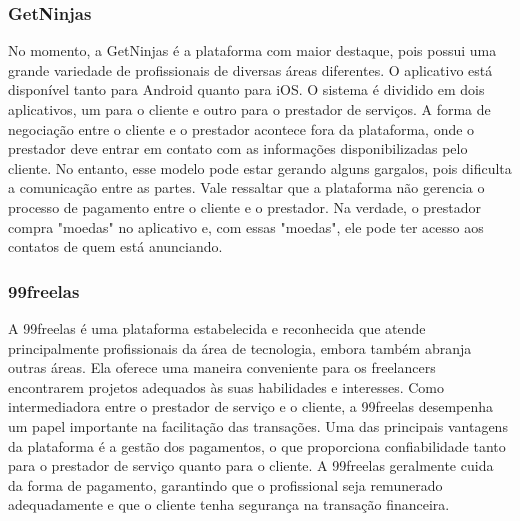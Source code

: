 \subsubsection{GetNinjas}
No momento, a GetNinjas é a plataforma com maior destaque, pois possui uma grande variedade de profissionais de diversas áreas diferentes.
O aplicativo está disponível tanto para Android quanto para iOS. O sistema é dividido em dois aplicativos, um para o cliente e outro para o
prestador de serviços. A forma de negociação entre o cliente e o prestador acontece fora da plataforma, onde o prestador deve entrar em contato com as informações disponibilizadas pelo cliente. No entanto, esse modelo pode estar gerando alguns gargalos, pois dificulta a comunicação entre as partes. Vale ressaltar que a plataforma não gerencia o processo de pagamento entre o cliente e o prestador. Na verdade, o prestador compra "moedas" no aplicativo e, com essas "moedas", ele pode ter acesso aos contatos de quem está anunciando.
\subsubsection{99freelas}
A 99freelas é uma plataforma estabelecida e reconhecida que atende principalmente profissionais da área de tecnologia, embora também abranja
outras áreas. Ela oferece uma maneira conveniente para os freelancers encontrarem projetos adequados às suas habilidades e interesses.
Como intermediadora entre o prestador de serviço e o cliente, a 99freelas desempenha um papel importante na facilitação das transações.
Uma das principais vantagens da plataforma é a gestão dos pagamentos, o que proporciona confiabilidade tanto para o prestador de serviço 
quanto para o cliente. A 99freelas geralmente cuida da forma de pagamento, garantindo que o profissional seja remunerado adequadamente e 
que o cliente tenha segurança na transação financeira.

